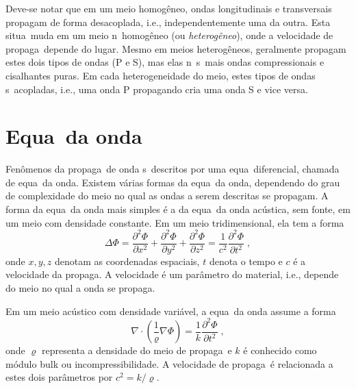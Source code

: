 Deve-se notar que em um meio homog\^eneo, ondas longitudinais e
transversais propagam de forma desacoplada, i.e., independentemente uma
da outra. Esta situa\cao\ muda em um meio n\ao\ homog\^eneo (ou {\it
heterog\^eneo}), onde a velocidade de propaga\cao\ depende do lugar.
Mesmo em meios heterog\^eneos, geralmente propagam estes dois tipos de
ondas (P e S), mas elas n\ao\ s\ao\ mais ondas compressionais e cisalhantes
puras. Em cada heterogeneidade do meio, estes tipos de ondas s\ao\
acopladas, i.e., uma onda P propagando cria uma onda S e vice versa.

\section{Equa\cao\ da onda}

Fen\^omenos da propaga\cao\ de onda s\ao\ descritos por uma equa\cao\
diferencial, chamada de equa\cao\ da onda. Existem v\'arias formas da
equa\cao\ da onda, dependendo do grau de complexidade do meio no qual as
ondas a serem descritas se propagam. A forma da equa\cao\ da onda mais
simples \'e a da equa\cao\ da onda ac\'ustica, sem fonte, em um meio com densidade
constante. Em um meio tridimensional, ela tem a forma
\begin{equation}
\Delta \Phi = 
\frac{\partial^2 \Phi}{\partial x^2} +
\frac{\partial^2 \Phi}{\partial y^2} +
\frac{\partial^2 \Phi}{\partial z^2}
= \frac{1}{c^2}
\frac{\partial^2 \Phi}{\partial t^2} \; ,
\label{eoadc}
\end{equation}
onde $x,y,z$ denotam as coordenadas espaciais, $t$ denota o tempo e $c$
\'e a velocidade da propaga\cao. A velocidade \'e um par\^ametro do
material, i.e., depende do meio no qual a onda se propaga.

Em um meio ac\'ustico com densidade vari\'avel, a equa\cao\ da onda
assume a forma
\begin{equation}
\nabla\cdot \left(\frac{1}{\varrho} \nabla \Phi \right)
= \frac{1}{k}
\frac{\partial^2 \Phi}{\partial t^2} \; ,
\label{eoadv}
\end{equation}
onde $\varrho$ representa a densidade do meio de propaga\cao\ e $k$ \'e
conhecido como m\'odulo bulk ou incompressibilidade. A velocidade de
propaga\cao\ \'e relacionada a estes dois par\^ametros por
$c^2=k/\varrho$.

